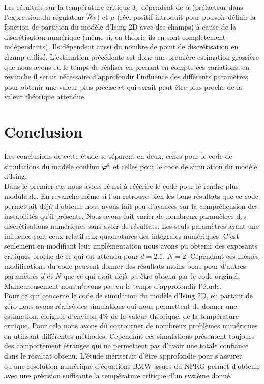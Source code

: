 \documentclass[10.5pt]{article}
\begin{document}
\begin{multicols}{2}
Les résultats sur la température critique $T_c$ dépendent de $\alpha$ (préfacteur dans l'expression du régulateur $\mathcal{R}_k$) et $\mu$ (réel positif introduit pour pouvoir définir la fonction de partition du modèle d'Ising 2D avec des champs) à cause de la discrétisation numérique (même si, en théorie ils en sont complètement indépendants). Ils dépendent aussi du nombre de point de discrétisation en champ utilisé. L'estimation précédente est donc une première estimation grossière que nous avons eu le temps de réaliser en prenant en compte ces variations, en revanche il serait nécessaire d'approfondir l'influence des différents paramètres pour obtenir une valeur plus précise et qui serait peut être plus proche de la valeur théorique attendue.


\section{Conclusion}

Les conclusions de cette étude se séparent en deux, celles pour le code de simulations du modèle continu $\boldsymbol{ \varphi}^4$ et celles pour le code de simulation du modèle d'Ising. \\

Dans le premier cas nous avons réussi à réécrire le code pour le rendre plus modulable. En revanche même si l'on retrouve bien les bons résultats que ce code permettait déjà d'obtenir nous avons fait peu d'avancés sur la compréhension des instabilités qu'il présente. Nous avons fait varier de nombreux paramètres des discrétisations numériques sans avoir de résultats. Les seuls paramètres ayant une influence sont ceux relatif aux quadratures des intégrales numériques. C'est seulement en modifiant leur implémentation nous avons pu obtenir des exposants critiques proche de ce qui est attendu pour $d=2.1$, $N=2$. Cependant ces mêmes modifications du code peuvent donner des résultats moins bons pour d'autres paramètres $d$ et $N$ que ce qui avait déjà pu être obtenu par le code originel. Malheureusement nous n'avons pas eu le temps d'approfondir l'étude. \\


Pour ce qui concerne le code de simulation du modèle d'Ising 2D, en partant de zéro nous avons réalisé des simulations qui nous permettent de donner une estimation, éloignée d'environ $4 \%$ de la valeur théorique, de la température critique. Pour cela nous avons dû contourner de nombreux problèmes numériques en utilisant différentes méthodes. Cependant ces simulations présentent toujours des comportement étranges qui ne permettent pas d'avoir une totale confiance dans le résultat obtenu. L'étude mériterait d'être approfondie pour s'assurer qu'une résolution numérique d'équations BMW issues du NPRG permet d'obtenir avec une précision suffisante la température critique d'un système donné.

\vfill

\pagebreak





\end{multicols}
\end{document}
